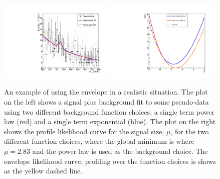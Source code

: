 \begin{figure}
  \begin{center}
    \includegraphics[width=0.49\textwidth]{analysis/plots/envelope_explain2.pdf}
    \includegraphics[width=0.49\textwidth]{analysis/plots/envelope_explain3.pdf}
    \caption{An example of using the envelope in a realistic situation. The plot on the left shows a signal plus background fit to some pseudo-data using two different background function choices; a single term power law (red) and a single term exponential (blue). The plot on the right shows the profile likelihood curve for the signal size, $\mu$, for the two different function choices, where the global minimum is where $\mu=2.83$ and the power law is used as the background choice. The envelope likelihood curve, profiling over the function choices is shows as the yellow dashed line.}
    \label{fig:envelope_explain2}
  \end{center}
\end{figure}

